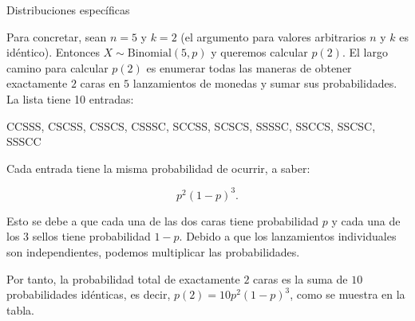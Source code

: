 \documentclass[10pt]{beamer}
\begin{document}
\begin{frame}{Distribuciones espec\'ificas}
	
\small{ Para concretar, sean $n = 5$ y $k = 2$  (el argumento para valores arbitrarios $n$ y $k$ es id\'entico). Entonces $X \sim \text{Binomial}(5, p)$ y queremos calcular $p(2)$. El largo camino para calcular $p(2)$ es enumerar todas las maneras de obtener exactamente $2$ caras en $5$ lanzamientos  de monedas y sumar sus probabilidades. La lista tiene 10 entradas:
	
CCSSS, CSCSS, CSSCS, CSSSC, SCCSS, SCSCS, SSSSC, SSCCS, SSCSC,
SSSCC
	
Cada entrada tiene la misma probabilidad de ocurrir, a saber:

\[
p^2(1 - p)^3.
\]
}

\scriptsize{Esto se debe a que cada una de las dos caras tiene probabilidad $p$ y cada una de los $3$ sellos tiene probabilidad $1 - p$. Debido a que los lanzamientos individuales son independientes, podemos multiplicar las probabilidades. 
	
Por  tanto, la probabilidad total de exactamente $2$ caras  es la suma de $10$ probabilidades id\'enticas, es decir, $p(2) = 10p^2 (1 - p)^3$, como se muestra en la tabla.
}
\end{frame}
\end{document}
